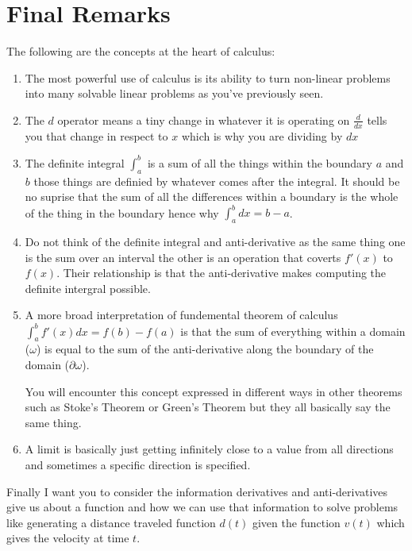 \documentclass[12pt]{book}
\begin{document}
\chapter{Final Remarks}
The following are the concepts at the heart of calculus:
\begin{enumerate}
	\item The most powerful use of calculus is its ability to turn non-linear problems into many solvable linear problems as you've previously seen.
	\item The $d$ operator means a tiny change in whatever it is operating on $\frac{d}{dx}$ tells you that change in respect to $x$ which is why you are dividing by $dx$
	\item The definite integral $\int_{a}^{b}$ is a sum of all the things within the boundary $a$ and $b$ those things are definied by whatever comes after the integral. 
		It should be no suprise that the sum of all the differences within a boundary is the whole of the thing in the boundary hence why $\int_{a}^{b} dx = b - a$.

	\item Do not think of the definite integral and anti-derivative as the same thing one is the sum over an interval the other is an operation that coverts $f'(x)$ to $f(x)$. Their relationship is that the anti-derivative makes computing the definite intergral possible.
	\item A more broad interpretation of fundemental theorem of calculus $\int_{a}^{b} f'(x)dx = f(b)-f(a)$ is that the sum of everything within a domain ($\omega$) is equal to the sum of the anti-derivative along the boundary of the domain ($\partial \omega$).

You will encounter this concept expressed in different ways in other theorems such as Stoke's Theorem or Green's Theorem but they all basically say the same thing.
\item A limit is basically just getting infinitely close to a value from all directions and sometimes a specific direction is specified.
\end{enumerate}

Finally I want you to consider the information derivatives and anti-derivatives give us about a function and how we can use that information to solve problems like generating a distance traveled function $d(t)$ given the function $v(t)$ which gives the velocity at time $t$.
\end{document}

